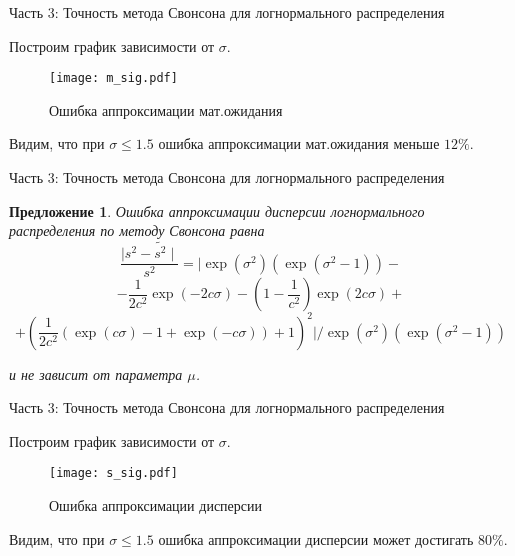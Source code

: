 \documentclass[ucs, notheorems, handout]{beamer}
\newtheorem{proposition2}[theorem]{Предложение}
\begin{document}
\begin{frame}{Часть 3: Точность метода Свонсона для логнормального распределения}
	
	Построим график зависимости от $\sigma$.

	\begin{figure}[h]
		\begin{center}
			\begin{minipage}[h]{0.5\linewidth}
				\texttt{[image: m\_sig.pdf]}
				\caption{Ошибка аппроксимации мат.ожидания} %
				\label{ris:image1} %
			\end{minipage}
			
		\end{center}
	\end{figure}
	
	Видим, что при $\sigma\leq1.5$ ошибка аппроксимации мат.ожидания меньше $12\%$. 
	
\end{frame}

\begin{frame}{Часть 3: Точность метода Свонсона для логнормального распределения}
	\begin{proposition2}\label{pr6}
		Ошибка аппроксимации дисперсии логнормального распределения по методу Свонсона равна
		\[\dfrac{\mid s^{2} - \widetilde{s^{2}} \mid}{s^{2}} = \biggl|\exp(\sigma^{2})(\exp(\sigma^{2}-1)) -\]\[- \dfrac{1}{2c^{2}}\exp(-2c\sigma)- \left( 1- \dfrac{1}{c^{2}}\right) \exp(2c\sigma)+\]\[+ \left( \dfrac{1}{2c^{2}}(\exp(c\sigma)-1+\exp(-c\sigma)) + 1\right) ^{2}\biggr| /\exp(\sigma^{2})(\exp(\sigma^{2}-1))\]
		
		
		и не зависит от параметра $\mu $.
	\end{proposition2}
\end{frame}

\begin{frame}{Часть 3: Точность метода Свонсона для логнормального распределения}
	
Построим график зависимости от $\sigma$.

	\begin{figure}[h]
	\begin{center}
		\begin{minipage}[h]{0.5\linewidth}
			\texttt{[image: s\_sig.pdf]}
			\caption{Ошибка аппроксимации дисперсии} %
			\label{ris:image2} %
		\end{minipage}
		
	\end{center}
\end{figure}

Видим, что при $\sigma\leq1.5$ ошибка аппроксимации дисперсии может достигать $80\%$. 
	
\end{frame}
	
\end{document}
